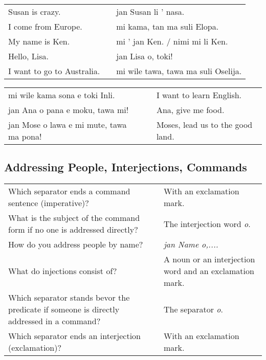 \begin{supertabular}{p{5,5cm}|ll}
    Susan is crazy.            &  & jan Susan li ' nasa.                \\ %
    I come from Europe.        &  & mi kama, tan ma suli Elopa.         \\ %
    My name is Ken.            &  & mi ' jan Ken. / nimi mi li Ken.     \\ %
    Hello, Lisa.               &  & jan Lisa o, toki!                   \\ %
    I want to go to Australia. &  & mi wile tawa, tawa ma suli Oselija. \\  %
\end{supertabular}

\begin{supertabular}{p{5,5cm}|ll}
    mi wile kama sona e toki Inli.           &  & I want to learn English.         \\
    jan Ana o pana e moku, tawa mi!          &  & Ana, give me food.               \\
    jan Mose o lawa e mi mute, tawa ma pona! &  & Moses, lead us to the good land. \\
\end{supertabular}

\newpage
%
\subsection*{Addressing People, Interjections, Commands}
\label{'commands_interjections'}
%
\begin{supertabular}{p{5,5cm}|ll}
    Which separator ends a command sentence (imperative)?                                      &  & With an exclamation mark.                               \\ %
    What is the subject of the command form if no one is addressed directly?                   &  & The interjection word \textit{o}.                       \\ %
    How do you address people by name?                                                         &  & \textit{jan Name o,.... }                               \\ %
    What do injections consist of?                                                             &  & A noun or an interjection word and an exclamation mark. \\ %
    Which separator stands bevor  the predicate if someone is directly addressed in a command? &  & The separator \textit{o}.                               \\ %
    Which separator ends an interjection (exclamation)?                                        &  & With an exclamation mark.                               \\ %
\end{supertabular}

